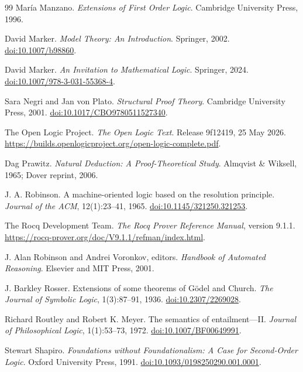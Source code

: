 \begin{thebibliography}{99}
Mar\'ia Manzano.
\emph{Extensions of First Order Logic}.
Cambridge University Press, 1996.

David Marker.
\emph{Model Theory: An Introduction}.
Springer, 2002.
\href{https://doi.org/10.1007/b98860}{doi:10.1007/b98860}.

David Marker.
\emph{An Invitation to Mathematical Logic}.
Springer, 2024.
\href{https://doi.org/10.1007/978-3-031-55368-4}{doi:10.1007/978-3-031-55368-4}.

Sara Negri and Jan von Plato.
\emph{Structural Proof Theory}.
Cambridge University Press, 2001.
\href{https://doi.org/10.1017/CBO9780511527340}{doi:10.1017/CBO9780511527340}.

The Open Logic Project.
\emph{The Open Logic Text}.
Release 9f12419, 25 May 2026.
\url{https://builds.openlogicproject.org/open-logic-complete.pdf}.

Dag Prawitz.
\emph{Natural Deduction: A Proof-Theoretical Study}.
Almqvist \& Wiksell, 1965; Dover reprint, 2006.

J. A. Robinson.
A machine-oriented logic based on the resolution principle.
\emph{Journal of the ACM}, 12(1):23--41, 1965.
\href{https://doi.org/10.1145/321250.321253}{doi:10.1145/321250.321253}.

The Rocq Development Team.
\emph{The Rocq Prover Reference Manual}, version 9.1.1.
\url{https://rocq-prover.org/doc/V9.1.1/refman/index.html}.

J. Alan Robinson and Andrei Voronkov, editors.
\emph{Handbook of Automated Reasoning}.
Elsevier and MIT Press, 2001.

J. Barkley Rosser.
Extensions of some theorems of G\"odel and Church.
\emph{The Journal of Symbolic Logic}, 1(3):87--91, 1936.
\href{https://doi.org/10.2307/2269028}{doi:10.2307/2269028}.

Richard Routley and Robert K. Meyer.
The semantics of entailment---II.
\emph{Journal of Philosophical Logic}, 1(1):53--73, 1972.
\href{https://doi.org/10.1007/BF00649991}{doi:10.1007/BF00649991}.

Stewart Shapiro.
\emph{Foundations without Foundationalism: A Case for Second-Order Logic}.
Oxford University Press, 1991.
\href{https://doi.org/10.1093/0198250290.001.0001}{doi:10.1093/0198250290.001.0001}.


\end{thebibliography}
